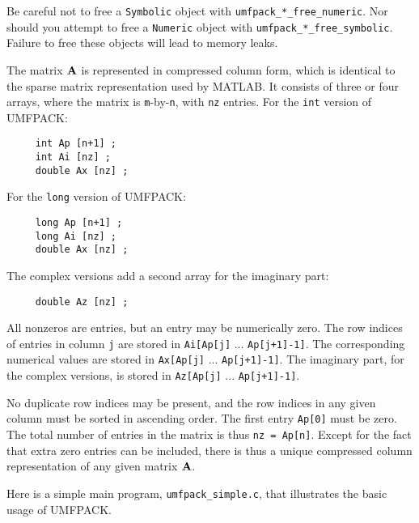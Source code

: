 Be careful not to free a {\tt Symbolic} object with
{\tt umfpack\_*\_free\_numeric}.  Nor should you attempt to free a {\tt Numeric}
object with {\tt umfpack\_*\_free\_symbolic}.
Failure to free these objects will lead to memory leaks.

The matrix ${\bf{A}}$ is represented in compressed column form, which is
identical to the sparse matrix representation used by MATLAB.  It consists
of three or four arrays, where the matrix is {\tt m}-by-{\tt n},
with {\tt nz} entries.  For the {\tt int} version of UMFPACK:

{\footnotesize
\begin{verbatim}
     int Ap [n+1] ;
     int Ai [nz] ;
     double Ax [nz] ;
\end{verbatim}
}

For the {\tt long} version of UMFPACK:

{\footnotesize
\begin{verbatim}
     long Ap [n+1] ;
     long Ai [nz] ;
     double Ax [nz] ;
\end{verbatim}
}

The complex versions add a second array for the imaginary part:

{\footnotesize
\begin{verbatim}
     double Az [nz] ;
\end{verbatim}
}

All nonzeros are entries, but an entry may be numerically zero.  The row indices
of entries in column {\tt j} are stored in
    {\tt Ai[Ap[j]} ... {\tt Ap[j+1]-1]}.
The corresponding numerical values are stored in
    {\tt Ax[Ap[j]} ... {\tt Ap[j+1]-1]}.
The imaginary part, for the complex versions, is stored in
    {\tt Az[Ap[j]} ... {\tt Ap[j+1]-1]}.

No duplicate row indices may be present, and the row indices in any given
column must be sorted in ascending order.  The first entry {\tt Ap[0]} must be
zero.  The total number of entries in the matrix is thus {\tt nz = Ap[n]}.
Except for the fact that extra zero entries can be included, there is thus a
unique compressed column representation of any given matrix ${\bf{A}}$.

Here is a simple main program, {\tt umfpack\_simple.c}, that illustrates the
basic usage of UMFPACK.

